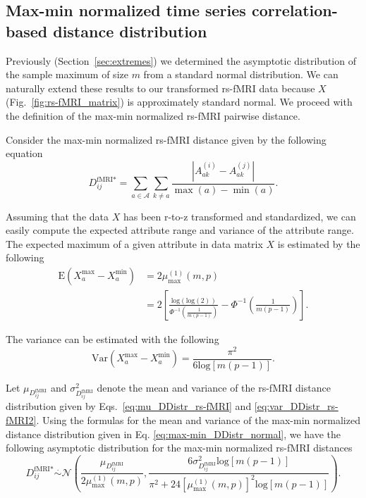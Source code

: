 \documentclass[aos]{imsart}
\begin{document}
\subsection{Max-min normalized time series correlation-based distance distribution}

Previously (Section~\ref{sec:extremes}) we determined the asymptotic distribution of the sample maximum of size $m$ from a standard normal distribution. We can naturally extend these results to our transformed rs-fMRI data because $X$ (Fig.~\ref{fig:rs-fMRI_matrix}) is approximately standard normal. We proceed with the definition of the max-min normalized rs-fMRI pairwise distance.

Consider the max-min normalized rs-fMRI distance given by the following equation
%
\begin{equation}\label{eq:max-min_diff_rs-fMRI}
D^\text{fMRI*}_{ij} = \sum_{a \in \mathcal{A}} \sum_{k \neq a} \frac{\left|A^{(i)}_{ak} - A^{(j)}_{ak}\right|}{\max(a) - \min(a)}.
\end{equation}

Assuming that the data $X$ has been r-to-z transformed and standardized, we can easily compute the expected attribute range and variance of the attribute range. The expected maximum of a given attribute in data matrix $X$ is estimated by the following
%
\begin{equation}\label{eq:mean_max_rs-fMRI}
\begin{aligned}
\text{E}\left(X^\text{max}_a - X^\text{min}_a\right) &= 2\mu^{(1)}_\text{max}(m,p) \\
&= 2 \left[\frac{\text{log}(\text{log}(2))}{\Phi^{-1}\left(\frac{1}{m(p-1)}\right)} - \Phi^{-1}\left(\frac{1}{m(p-1)}\right)\right].
\end{aligned}
\end{equation}

The variance can be estimated with the following
%
\begin{equation}\label{eq:var_max_rs-fMRI}
\text{Var}\left(X^\text{max}_a - X^\text{min}_a\right) = \frac{\pi^2}{6\text{log}[m(p-1)]}.
\end{equation}

Let $\mu_{D^\text{fMRI}_{ij}}$ and $\sigma^2_{D^\text{fMRI}_{ij}}$ denote the mean and variance of the rs-fMRI distance distribution given by Eqs.~\ref{eq:mu_DDistr_rs-fMRI} and \ref{eq:var_DDistr_rs-fMRI2}. Using the formulas for the mean and variance of the max-min normalized distance distribution given in Eq. \ref{eq:max-min_DDistr_normal}, we have the following asymptotic distribution for the max-min normalized rs-fMRI distances
%
\begin{equation}\label{eq:max-min_DDistr_normal_rs-fMRI}
D^\text{fMRI*}_{ij} \overset{.}{\sim} \mathcal{N}\left(\frac{\mu_{D^\text{fMRI}_{ij}}}{2\mu^{(1)}_\text{max}(m,p)}, \frac{6\sigma^2_{D^\text{fMRI}_{ij}}\text{log}[m(p-1)]}{\pi^2 + 24\left[\mu^{(1)}_\text{max}(m,p)\right]^2\text{log}[m(p-1)]}\right).
\end{equation}
\end{document}
